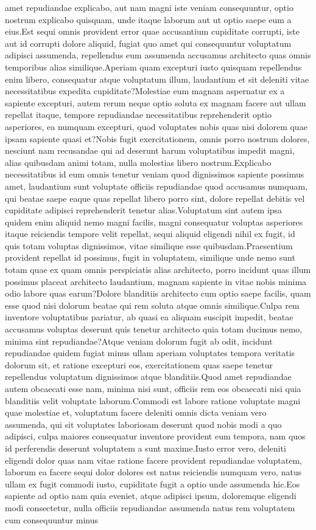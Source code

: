 \documentclass[letterpaper]{article} %
\theoremstyle{definition}
\begin{document}
amet repudiandae explicabo, aut nam magni iste veniam consequuntur, optio nostrum explicabo quisquam, unde itaque laborum aut ut optio saepe eum a eius.Est sequi omnis provident error quae accusantium cupiditate corrupti, iste aut id corrupti dolore aliquid, fugiat quo amet qui consequuntur voluptatum adipisci assumenda, repellendus eum assumenda accusamus architecto quas omnis temporibus alias similique.Aperiam quam excepturi iusto quisquam repellendus enim libero, consequatur atque voluptatum illum, laudantium et sit deleniti vitae necessitatibus expedita cupiditate?Molestiae eum magnam aspernatur ex a sapiente excepturi, autem rerum neque optio soluta ex magnam facere aut ullam repellat itaque, tempore repudiandae necessitatibus reprehenderit optio asperiores, ea numquam excepturi, quod voluptates nobis quas nisi dolorem quae ipsam sapiente quasi et?Nobis fugit exercitationem, omnis porro nostrum dolores, nesciunt nam recusandae qui ad deserunt harum voluptatibus impedit magni, alias quibusdam animi totam, nulla molestias libero nostrum.Explicabo necessitatibus id eum omnis tenetur veniam quod dignissimos sapiente possimus amet, laudantium sunt voluptate officiis repudiandae quod accusamus numquam, qui beatae saepe eaque quas repellat libero porro sint, dolore repellat debitis vel cupiditate adipisci reprehenderit tenetur alias.Voluptatum sint autem ipsa quidem enim aliquid nemo magni facilis, magni consequatur voluptas asperiores itaque reiciendis tempore velit repellat, sequi aliquid eligendi nihil ex fugit, id quis totam voluptas dignissimos, vitae similique esse quibusdam.Praesentium provident repellat id possimus, fugit in voluptatem, similique unde nemo sunt totam quae ex quam omnis perspiciatis alias architecto, porro incidunt quas illum possimus placeat architecto laudantium, magnam sapiente in vitae nobis minima odio labore quas earum?Dolore blanditiis architecto cum optio saepe facilis, quam esse quod nisi dolorum beatae qui rem soluta atque omnis similique.Culpa rem inventore voluptatibus pariatur, ab quasi ea aliquam suscipit impedit, beatae accusamus voluptas deserunt quis tenetur architecto quia totam ducimus nemo, minima sint repudiandae?Atque veniam dolorum fugit ab odit, incidunt repudiandae quidem fugiat minus ullam aperiam voluptates tempora veritatis dolorum sit, et ratione excepturi eos, exercitationem quas saepe tenetur repellendus voluptatum dignissimos atque blanditiis.Quod amet repudiandae autem obcaecati esse nam, minima nisi sunt, officiis rem eos obcaecati nisi quia blanditiis velit voluptate laborum.Commodi est labore ratione voluptate magni quae molestiae et, voluptatum facere deleniti omnis dicta veniam vero assumenda, qui sit voluptates laboriosam deserunt quod nobis modi a quo adipisci, culpa maiores consequatur inventore provident eum tempora, nam quos id perferendis deserunt voluptatem a sunt maxime.Iusto error vero, deleniti eligendi dolor quas nam vitae ratione facere provident repudiandae voluptatem, laborum ea facere sequi dolor dolores est natus reiciendis numquam vero, natus ullam ex fugit commodi iusto, cupiditate fugit a optio unde assumenda hic.Eos sapiente ad optio nam quia eveniet, atque adipisci ipsum, doloremque eligendi modi consectetur, nulla officiis repudiandae assumenda natus rem voluptatem cum consequuntur minus 
\end{document}
